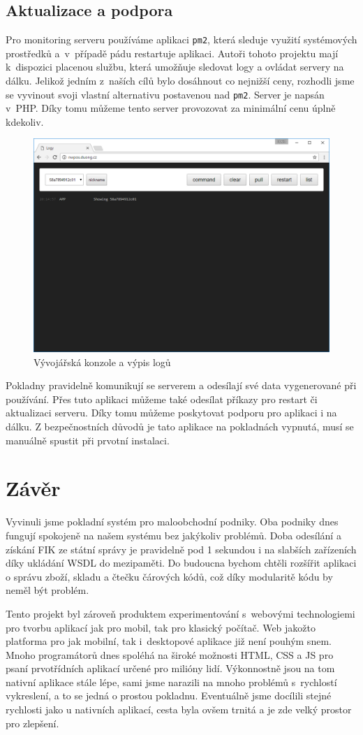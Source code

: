 \documentclass[a4paper,11pt,oneside]{article}
\begin{document}
\subsection{Aktualizace a podpora}

Pro monitoring serveru používáme aplikaci \lstinline|pm2|, která sleduje využití systémových prostředků a~v~případě pádu restartuje aplikaci. Autoři tohoto projektu mají k~dispozici placenou službu, která umožňuje sledovat logy a ovládat servery na dálku. Jelikož jedním z~naších cílů bylo dosáhnout co nejnižší ceny, rozhodli jsme se vyvinout svoji vlastní alternativu postavenou nad \lstinline|pm2|. Server je napsán v~PHP. Díky tomu můžeme tento server provozovat za minimální cenu úplně kdekoliv.

\begin{figure}[H]
	\centering
	\includegraphics[width=0.5\linewidth]{../logs}
	\caption{Vývojářská konzole a výpis logů}
	\label{fig:logs}
\end{figure}

Pokladny pravidelně komunikují se serverem a odesílají své data vygenerované při používání. Přes tuto aplikaci můžeme také odesílat příkazy pro restart či aktualizaci serveru. Díky tomu můžeme poskytovat podporu pro aplikaci i na dálku. Z bezpečnostních důvodů je tato aplikace na pokladnách vypnutá, musí se manuálně spustit při prvotní instalaci.  

\pagebreak
\section{Závěr}
Vyvinuli jsme pokladní systém pro maloobchodní podniky. Oba podniky dnes fungují spokojeně na našem systému bez jakýkoliv problémů. Doba odesílání a získání FIK ze státní správy je pravidelně pod 1 sekundou i na slabších zařízeních díky ukládání WSDL do mezipaměti. Do budoucna bychom chtěli rozšířit aplikaci o správu zboží, skladu a čtečku čárových kódů, což díky modularitě kódu by neměl být problém.

Tento projekt byl zároveň produktem experimentování s~webovými technologiemi pro tvorbu aplikací jak pro mobil, tak pro klasický počítač. Web jakožto platforma pro jak mobilní, tak i~desktopové aplikace již není pouhým snem. Mnoho programátorů dnes spoléhá na široké možnosti HTML, CSS a JS pro psaní prvotřídních aplikací určené pro milióny lidí. Výkonnostně jsou na tom nativní aplikace stále lépe, sami jsme narazili na mnoho problémů s~rychlostí vykreslení, a to se jedná o prostou pokladnu. Eventuálně jsme docílili stejné rychlosti jako u nativních aplikací, cesta byla ovšem trnitá a je zde velký prostor pro zlepšení. 
\end{document}

